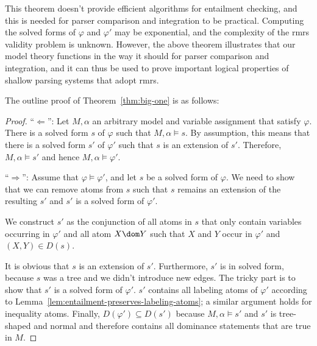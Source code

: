 

This theorem doesn't provide 
efficient
algorithms for entailment checking, and this is needed
for parser comparison and integration to be
practical.  Computing the solved forms of $\varphi$ and $\varphi'$ may
be exponential, and the complexity of the {\sc rmrs} validity problem
is unknown.  However, the above theorem illustrates that our
model theory functions in the way it should for parser
comparison and integration, and it can thus be used to prove important
logical properties of shallow parsing systems that adopt {\sc rmrs}.

The outline proof of Theorem~\ref{thm:big-one} is as follows:
\begin{proof}
  ``$\Leftarrow$'': Let $M,\alpha$ an arbitrary model and variable
  assignment that satisfy $\varphi$.  There is a solved form $s$ of
  $\varphi$ such that $M,\alpha \models s$.  By assumption, this means
  that there is a solved form $s'$ of $\varphi'$ such that $s$ is an
  extension of $s'$.  Therefore, $M,\alpha \models s'$ and hence
  $M,\alpha \models \varphi'$.

  ``$\Rightarrow$'': Assume that $\varphi \models \varphi'$, and let
  $s$ be a solved form of $\varphi$.  We need to show that
  we can remove atoms from $s$ such that $s$ remains an extension of
  the resulting $s'$ and $s'$ is a solved form of $\varphi'$.

  We construct $s'$ as the conjunction of all atoms in $s$ that only
  contain variables occurring in $\varphi'$ and all atom $X \dom Y$
  such that $X$ and $Y$ occur in $\varphi'$ and $(X,Y) \in D(s)$.

  It is obvious that $s$ is an extension of $s'$.  Furthermore, $s'$
  is in solved form, because $s$ was a tree and we didn't
  introduce new edges.  The tricky part is to show that $s'$ is a
  solved form of $\varphi'$.  $s'$ contains all labeling atoms of
  $\varphi'$ according to
  Lemma~\ref{lem:entailment-preserves-labeling-atoms}; a similar
  argument holds for inequality atoms.  Finally, $D(\varphi')
  \subseteq D(s')$ because $M,\alpha \models s'$ and $s'$ is
  tree-shaped and normal and therefore contains all dominance statements
  that are true in $M$.
\end{proof}

